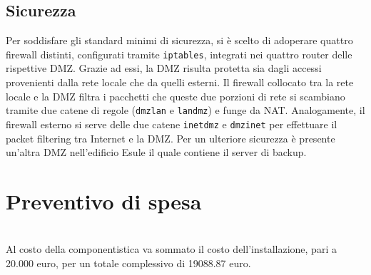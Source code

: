 \documentclass[]{scrartcl}
\def\code#1{\texttt{#1}}
\begin{document}
\subsection{Sicurezza}
Per soddisfare gli standard minimi di sicurezza, si è scelto di adoperare quattro firewall distinti, configurati tramite \code{iptables}, integrati nei quattro router delle rispettive DMZ. Grazie ad essi, la DMZ risulta protetta sia dagli accessi provenienti dalla rete locale che da quelli esterni. Il firewall collocato tra la rete locale e la DMZ filtra i pacchetti che queste due porzioni di rete si scambiano tramite due catene di regole (\code{dmzlan} e \code{landmz}) e funge da NAT. Analogamente, il firewall esterno si serve delle due catene \code{inetdmz} e \code{dmzinet} per effettuare il packet filtering tra Internet e la DMZ. Per un ulteriore sicurezza è presente un'altra DMZ nell'edificio Esule il quale contiene il server di backup.
\section{Preventivo di spesa}

\begin{table}[H]
	\centering
	\label{costo componentistica}
	\caption{Costo delle componenti hardware}
\end{table}
\ \\Al costo della componentistica va sommato il costo dell'installazione, pari a 20.000 euro, per un totale complessivo di 19088.87 euro.
\end{document}
